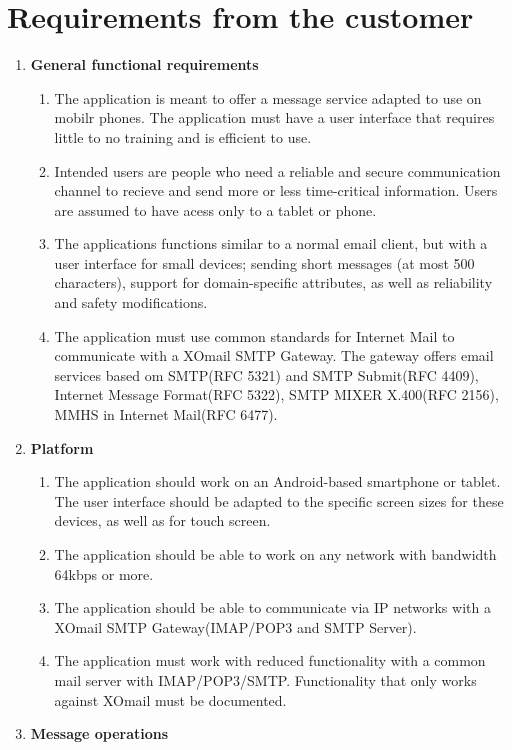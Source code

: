 

\section{Requirements from the customer}

\begin{enumerate}
\item{} \textbf{General functional requirements}
\begin{enumerate}
\item{}The application is meant to offer a message service adapted to use on mobilr phones. The application must have a user interface that requires little to no training and is efficient to use.
\item{}Intended users are people who need a reliable and secure communication channel to recieve and send more or less time-critical information. Users are assumed to have acess only to a tablet or phone.
\item{}The applications functions similar to a normal email client, but with a user interface for small devices; sending short messages (at most 500 characters), support for domain-specific attributes, as well as reliability and safety modifications.
\item{}The application must use common standards for Internet Mail to communicate with a XOmail SMTP Gateway. The gateway offers email services based om SMTP(RFC 5321) and SMTP Submit(RFC 4409), Internet Message Format(RFC 5322), SMTP MIXER X.400(RFC 2156), MMHS in Internet Mail(RFC 6477).
\end{enumerate}
\item{}\textbf{Platform}
\begin{enumerate}
\item{}The application should work on an Android-based smartphone or tablet. The user interface should be adapted to the specific screen sizes for these devices, as well as for touch screen.
\item{}The application should be able to work on any network with bandwidth 64kbps or more.
\item{}The application should be able to communicate via IP networks with a XOmail SMTP Gateway(IMAP/POP3 and SMTP Server).
\item{}The application must work with reduced functionality with a common mail server with IMAP/POP3/SMTP. Functionality that only works against XOmail must be documented.
\end{enumerate}
\item{}\textbf{Message operations}

\end{enumerate}
